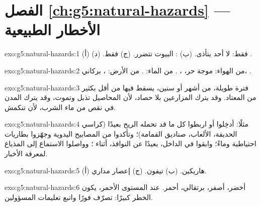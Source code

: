 \section*{الفصل \ref{ch:g5:natural-hazards} --- الأخطار الطبيعية}

\begin{solution}{exo:g5:natural-hazards:1}
(أ)  فقط: لا أحد يتأذى. (ب) : البيوت
تتضرر. (ج)  فقط. (د) .
\end{solution}

\begin{solution}{exo:g5:natural-hazards:2}
من الهواء: موجة حر، ، . من الماء: . من
الأرض: ،  بركاني، .
\end{solution}

\begin{solution}{exo:g5:natural-hazards:3}
 فترة طويلة، من أشهر أو سنين، يسقط فيها من  أقل بكثير من
المعتاد. وقد يترك المزارعين بلا حصاد، لأن المحاصيل تذبل
وتموت، وقد يترك المدن في نقص من ماء الشرب، لأن 
 تنكمش.
\end{solution}

\begin{solution}{exo:g5:natural-hazards:4}
مثلًا: أدخِلوا أو اربطوا كل ما قد تحمله الريح بعيدًا
(كراسي الحديقة، الألعاب، صناديق القمامة)؛ وتأكدوا من المصابيح اليدوية وجهّزوا بطاريات احتياطية
وماءً؛ وابقوا في الداخل، بعيدًا عن النوافذ، أثناء ؛ وواصلوا
الاستماع إلى المذياع لمعرفة الأخبار.
\end{solution}

\begin{solution}{exo:g5:natural-hazards:5}
(أ) هاريكين. (ب) تيفون. (ج) إعصار مداري.
\end{solution}

\begin{solution}{exo:g5:natural-hazards:6}
أخضر، أصفر، برتقالي، أحمر. عند المستوى الأحمر، يكون الخطر كبيرًا: تصرّف
فورًا واتبع تعليمات المسؤولين.
\end{solution}

